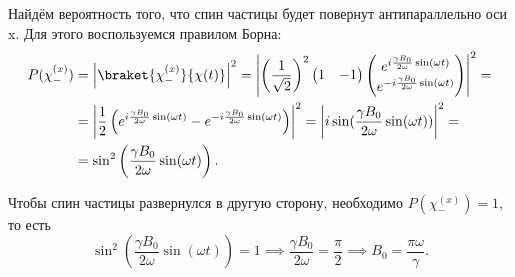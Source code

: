Найдём вероятность того, что спин частицы будет повернут антипараллельно оси x.
Для этого воспользуемся правилом Борна:
\begin{align*}
  P(\chi^{(x)}_-) &= \left|\braket{\chi^{(x)}_-}{\chi(t)}\right|^2 = \left|\left(\frac{1}{\sqrt{2}}\right)^2\begin{pmatrix}1 & -1\end{pmatrix}\begin{pmatrix} e^{i\frac{\gamma B_0}{2\omega}\sin(\omega t)} \\ e^{-i\frac{\gamma B_0}{2\omega}\sin(\omega t)} \end{pmatrix}\right|^2 = \\ &= \left|\frac{1}{2}\left(e^{i\frac{\gamma B_0}{2\omega}\sin(\omega t)} - e^{-i\frac{\gamma B_0}{2\omega}\sin(\omega t)}\right)\right|^2 = \left|i\sin(\frac{\gamma B_0}{2\omega}\sin(\omega t))\right|^2 = \\
  & = \sin^2\left(\frac{\gamma B_0}{2\omega}\sin(\omega t)\right).
\end{align*}

Чтобы спин частицы развернулся в другую сторону, необходимо $P(\chi^{(x)}_-) =
  1$, то есть
\[
  \sin^2\left(\frac{\gamma B_0}{2\omega}\sin(\omega t)\right) = 1 \implies \frac{\gamma B_0}{2\omega} = \frac{\pi}{2} \implies B_0 = \frac{\pi\omega}{\gamma}.
\]

\qedsq